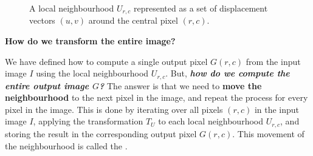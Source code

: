 \begin{figure}[!htp]
    \caption{A local neighbourhood $U_{r,c}$ represented as a set of displacement vectors $(u,v)$ around the central pixel $(r,c)$.}
    \label{fig:local-neighbourhoods}
\end{figure}

\begin{flushleft}
    \textcolor{Green3}{ \textbf{How do we transform the entire image?}}
\end{flushleft}
We have defined how to compute a single output pixel $G(r,c)$ from the input image $I$ using the local neighbourhood $U_{r,c}$. But, \textbf{\emph{how do we compute the entire output image $G$?}} The answer is that we need to \textbf{move the neighbourhood} to the next pixel in the image, and repeat the process for every pixel in the image. This is done by iterating over all pixels $(r,c)$ in the input image $I$, applying the transformation $T_U$ to each local neighbourhood $U_{r,c}$, and storing the result in the corresponding output pixel $G(r,c)$. This movement of the neighbourhood is called the .

